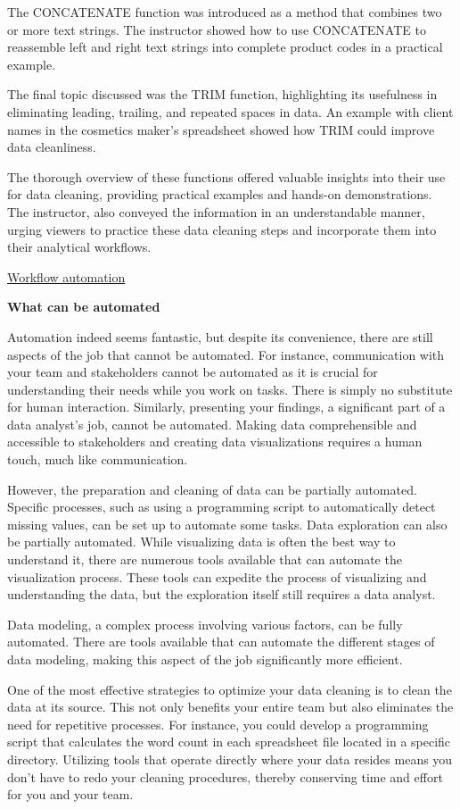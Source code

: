 \documentclass[]{article}
\begin{document}
The CONCATENATE function was introduced as a method that combines two or more text strings. The instructor showed how to use CONCATENATE to reassemble left and right text strings into complete product codes in a practical example.

The final topic discussed was the TRIM function, highlighting its usefulness in eliminating leading, trailing, and repeated spaces in data. An example with client names in the cosmetics maker's spreadsheet showed how TRIM could improve data cleanliness.

The thorough overview of these functions offered valuable insights into their use for data cleaning, providing practical examples and hands-on demonstrations. The instructor, also conveyed the information in an understandable manner, urging viewers to practice these data cleaning steps and incorporate them into their analytical workflows.

\uline{Workflow automation}

\textbf{What can be automated}

Automation indeed seems fantastic, but despite its convenience, there are still aspects of the job that cannot be automated. For instance, communication with your team and stakeholders cannot be automated as it is crucial for understanding their needs while you work on tasks. There is simply no substitute for human interaction. Similarly, presenting your findings, a significant part of a data analyst's job, cannot be automated. Making data comprehensible and accessible to stakeholders and creating data visualizations requires a human touch, much like communication.

However, the preparation and cleaning of data can be partially automated. Specific processes, such as using a programming script to automatically detect missing values, can be set up to automate some tasks. Data exploration can also be partially automated. While visualizing data is often the best way to understand it, there are numerous tools available that can automate the visualization process. These tools can expedite the process of visualizing and understanding the data, but the exploration itself still requires a data analyst.

Data modeling, a complex process involving various factors, can be fully automated. There are tools available that can automate the different stages of data modeling, making this aspect of the job significantly more efficient.

One of the most effective strategies to optimize your data cleaning is to clean the data at its source. This not only benefits your entire team but also eliminates the need for repetitive processes. For instance, you could develop a programming script that calculates the word count in each spreadsheet file located in a specific directory. Utilizing tools that operate directly where your data resides means you don’t have to redo your cleaning procedures, thereby conserving time and effort for you and your team.
\end{document}
